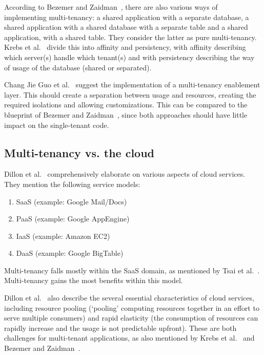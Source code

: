 According to Bezemer and Zaidman~\cite{bezemer2010multi}, there are also various ways of implementing multi-tenancy: a shared application with a separate database, a shared application with a shared database with a separate table and a shared application, with a shared table. They consider the latter as pure multi-tenancy. Krebs et al.~\cite{krebs2012architecture} divide this into affinity and persistency, with affinity describing which server(s) handle which tenant(s) and with persistency describing the way of usage of the database (shared or separated).

Chang Jie Guo et al.~\cite{guo2007framework} suggest the implementation of a multi-tenancy enablement layer. This should create a separation between usage and resources, creating the required isolations and allowing customizations. This can be compared to the blueprint of Bezemer and Zaidman~\cite{bezemer2010multi}, since both approaches should have little impact on the single-tenant code.

\subsection{Multi-tenancy vs. the cloud}


Dillon et al.~\cite{dillon2010cloud} comprehensively elaborate on various aspects of cloud services. They mention the following service models: 
\begin{enumerate}
\item \acf{SaaS} (example: Google Mail/Docs)
\item \acf{PaaS} (example: Google AppEngine)
\item \acf{IaaS} (example: Amazon EC2)
\item \acf{DaaS} (example: Google BigTable)
\end{enumerate}

Multi-tenancy falls mostly within the \ac{SaaS} domain, as mentioned by Tsai et al.~\cite{tsai2010towards}. Multi-tenancy gains the most benefits within this model.

Dillon et al.~\cite{dillon2010cloud} also describe the several essential characteristics of cloud services, including resource pooling (`pooling' computing resources together in an effort to serve multiple consumers) and rapid elasticity (the consumption of resources can rapidly increase and the usage is not predictable upfront). These are both challenges for multi-tenant applications, as also mentioned by Krebs et al.~\cite{krebs2012architecture} and Bezemer and Zaidman~\cite{bezemer2010multi}.

